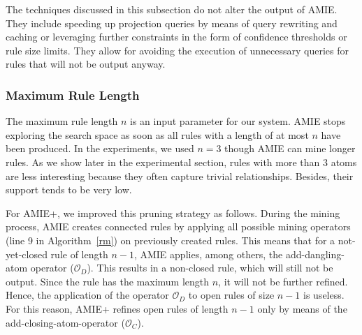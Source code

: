 
The techniques discussed in this subsection do not alter the output of AMIE. They include speeding up projection queries
by means of query rewriting and caching or leveraging further constraints in the form of confidence thresholds or
rule size limits. They allow for avoiding the execution of unnecessary queries for rules that will not be output anyway.

\subsubsection{Maximum Rule Length}

The maximum rule length $n$ is an input parameter for our system. AMIE stops exploring the search space as soon as all rules with a length of at most $n$ have been produced.
In the experiments,
we used $n=3$ though AMIE can mine longer rules. As we show later in the experimental section,
rules with more than 3 atoms are less interesting because they often capture trivial relationships. Besides, their support tends to be very low.

For AMIE+, we improved this pruning strategy as follows.
During the mining process, AMIE creates connected rules by applying all possible mining operators (line 9 in Algorithm~\ref{rm}) on previously created rules.
This means that for a not-yet-closed rule of length $n-1$, AMIE applies, among others, the add-dangling-atom operator ($\mathcal{O}_D$). This results in a non-closed rule,
which will still not be output. Since the rule has the maximum length $n$, it will not be further refined.
Hence, the application of the operator $\mathcal{O}_D$ to open rules of size $n-1$ is useless.
For this reason, AMIE+ refines open rules of length $n-1$ only by means of the add-closing-atom-operator ($\mathcal{O}_C$).

